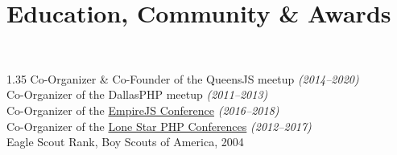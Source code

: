 \documentclass{resume}
\begin{document}
\section{Education, Community \& Awards}

\\
\begin{spacing}{1.35}
  Co-Organizer \& Co-Founder of the QueensJS meetup \emph{(2014--2020)}
  \\
  Co-Organizer of the DallasPHP meetup \emph{(2011--2013)}
  \\
  Co-Organizer of the \href{http://empirejs.org/}{EmpireJS Conference} \emph{(2016--2018)}
  \\
  Co-Organizer of the \href{http://lonestarphp.com/}{Lone Star PHP Conferences} \emph{(2012--2017)}
  \\
  Eagle Scout Rank, Boy Scouts of America, 2004
\end{spacing}
\end{document}
